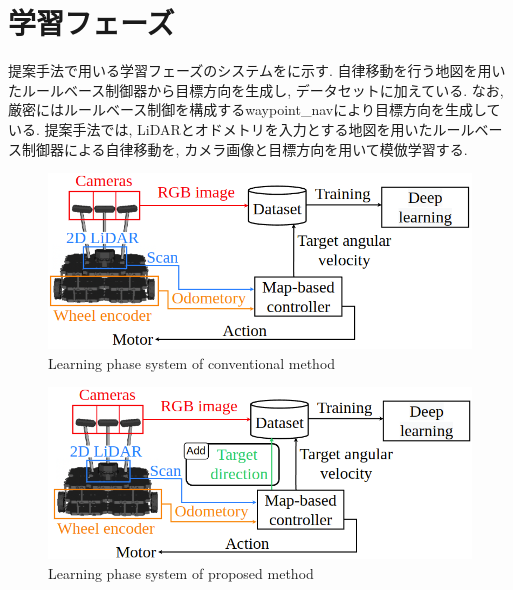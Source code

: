 
\section{学習フェーズ}
提案手法で用いる学習フェーズのシステムをに示す. 自律移動を行う地図を用いたルールベース制御器から目標方向を生成し, データセットに加えている. 
なお, 厳密にはルールベース制御を構成するwaypoint\_navにより目標方向を生成している. 
提案手法では, 
LiDARとオドメトリを入力とする地図を用いたルールベース制御器による自律移動を, カメラ画像と目標方向を用いて模倣学習する.

\begin{figure}[hbtp]
     \centering
    \includegraphics[keepaspectratio, scale=0.45]
         {images/conventional.png}
    \caption{Learning phase system of conventional method}
    \label{Fig:conventional}
   \end{figure}   

\begin{figure}[hbtp]
  \centering
 \includegraphics[keepaspectratio, scale=0.45]
      {images/suggest_learning_sys2.png}
 \caption{Learning phase system of proposed method}
 \label{Fig:suggest_learning_sys}
\end{figure}


\newpage
